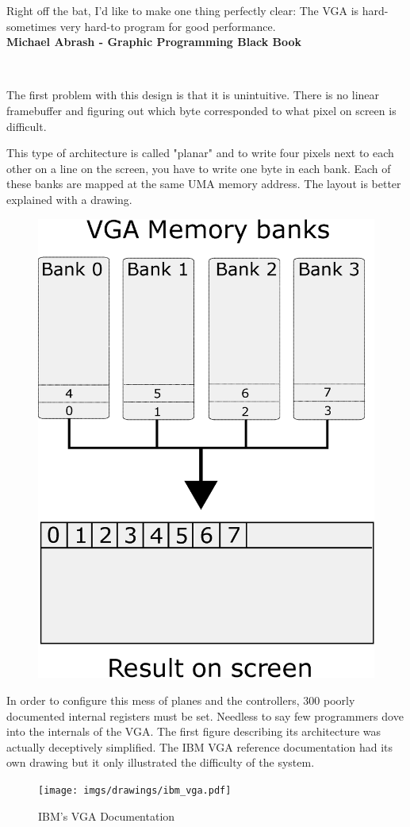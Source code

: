 \documentclass[book.tex]{subfiles}
\begin{document}
 \begin{fancyquotes}
   Right off the bat, I'd like to make one thing perfectly clear: The VGA is hard-sometimes very hard-to program for good performance.
 \bigskip \\
\textbf{Michael Abrash - Graphic Programming Black Book}
 \end{fancyquotes}
 \\
\par
The first problem with this design is that it is unintuitive. There is no linear framebuffer and figuring out which byte corresponded to what pixel on screen is difficult.\\
\par
 This type of architecture is called "planar" and to write four pixels next to each other on a line on the screen, you have to write one byte in each bank. Each of these banks are mapped at the same UMA memory address. The layout is better explained with a drawing.\\
\par
\begin{figure}[H]
\centering
\includegraphics[width=.6\textwidth]{imgs/drawings/vga_ram_screen_layout.eps}
\label{fig:vga_arch}
\end{figure}

 

\par
In order to configure this mess of planes and the controllers, 300 poorly documented internal registers must be set. Needless to say few programmers dove into the internals of the VGA. The first figure describing its architecture was actually deceptively simplified. The IBM VGA reference documentation had its own drawing but it only illustrated the difficulty of the system.\\
 \begin{figure}[H]
\centering
\texttt{[image: imgs/drawings/ibm\_vga.pdf]}
\caption{IBM's VGA Documentation}
\label{fig:ibm_vga}
\end{figure}
\end{document}
